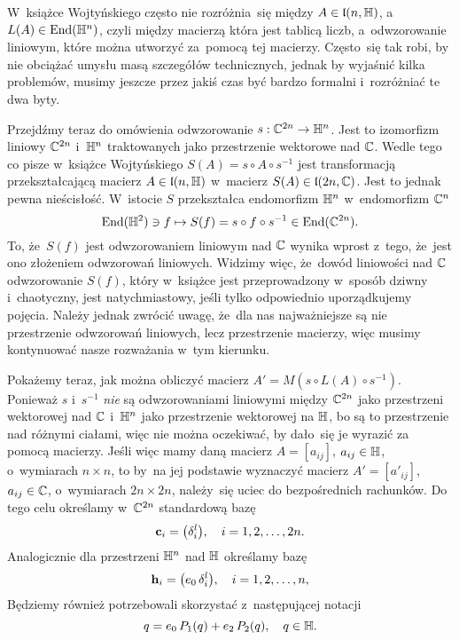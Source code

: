 \documentclass[a4paper,11pt]{article}
\begin{document}
W~książce Wojtyńskiego często nie rozróżnia~się między
$A \in \mathfrak{l}( n, \mathbb{H} )$, a~$L( A ) \in \mathrm{End}( \mathbb{H}^{ n } )$, czyli między
macierzą która jest tablicą liczb, a~odwzorowanie liniowym, które można
utworzyć za~pomocą tej macierzy. Często~się tak robi, by nie obciążać
umysłu masą szczegółów technicznych, jednak by wyjaśnić kilka problemów,
musimy jeszcze przez jakiś czas być bardzo formalni i~rozróżniać te dwa
byty.

Przejdźmy teraz do omówienia odwzorowanie $s : \mathbb{C}^{ 2n } \to \mathbb{H}^{ n }$.
Jest to izomorfizm liniowy $\mathbb{C}^{ 2n }$ i~$\mathbb{H}^{ n }$ traktowanych
jako przestrzenie wektorowe nad $\mathbb{C}$. Wedle tego co pisze w~książce
Wojtyńskiego $S( A ) = s \circ A \circ s^{ -1 }$ jest transformacją przekształcającą
macierz $A \in \mathfrak{l}( n, \mathbb{H} )$ w~macierz $S( A ) \in \mathfrak{l}( 2n, \mathbb{C} )$.
Jest to jednak pewna nieścisłość. W~istocie $S$ przekształca endomorfizm
$\mathbb{H}^{ n }$ w~endomorfizm $\mathbb{C}^{ n }$
\begin{equation}
  \label{eq:Wojtynski-86}
  \mathrm{End}( \mathbb{H}^{ 2 } ) \ni f \mapsto S( f ) = s \circ f \circ s^{ -1 } \in \mathrm{End}( \mathbb{C}^{ 2n } ).
\end{equation}
To, że~$S( f )$ jest odwzorowaniem liniowym nad $\mathbb{C}$ wynika wprost
z~tego, że~jest ono złożeniem odwzorowań liniowych. Widzimy więc, że~dowód
liniowości nad $\mathbb{C}$ odwzorowanie $S( f )$, który w~książce jest
przeprowadzony w~sposób dziwny i~chaotyczny, jest natychmiastowy, jeśli
tylko odpowiednio uporządkujemy pojęcia. Należy jednak zwrócić uwagę,
że~dla nas najważniejsze są nie przestrzenie odwzorowań liniowych, lecz
przestrzenie macierzy, więc musimy kontynuować nasze rozważania w~tym
kierunku.

Pokażemy teraz, jak można obliczyć macierz
$A' = M\!\left( s \circ L( A ) \circ s^{ -1 } \right)$. Ponieważ $s$ i~$s^{ -1 }$
\textit{nie} są odwzorowaniami liniowymi między $\mathbb{C}^{ 2n }$ jako
przestrzeni wektorowej nad $\mathbb{C}$ i~$\mathbb{H}^{ n }$ jako przestrzenie
wektorowej na $\mathbb{H}$, bo są to przestrzenie nad różnymi ciałami, więc nie
można oczekiwać, by dało~się je wyrazić za pomocą macierzy. Jeśli więc mamy
daną macierz $A = [ a_{ i j } ]$, $a_{ i j } \in \mathbb{H}$, o~wymiarach $n \times n$, to
by~na jej podstawie wyznaczyć macierz $A' = [ a'_{ i j } ]$,
$a_{ i j } \in \mathbb{C}$, o~wymiarach $2n \times 2n$, należy~się uciec do bezpośrednich
rachunków. Do tego celu określamy w~$\mathbb{C}^{ 2n }$ standardową bazę
\begin{equation}
  \label{eq:Wojtynski-84}
  \mathbf{c}_{ i } = \big( \delta^{ l }_{ i } \big), \quad
  i = 1, 2, \ldots, 2n.
\end{equation}
Analogicznie dla przestrzeni $\mathbb{H}^{ n }$ nad $\mathbb{H}$ określamy bazę
\begin{equation}
  \label{eq:Wojtynski-85}
  \mathbf{h}_{ i } = \big( e_{ 0 } \, \delta^{ l }_{ i } \big), \quad
  i = 1, 2, \ldots, n,
\end{equation}
Będziemy również potrzebowali skorzystać z~następującej notacji
\begin{equation}
  \label{eq:Wojtynski-86}
  q = e_{ 0 } \, P_{ 1 }( q ) + e_{ 2 } \, P_{ 2 }( q ), \quad
  q \in \mathbb{H}.
\end{equation}
\end{document}
